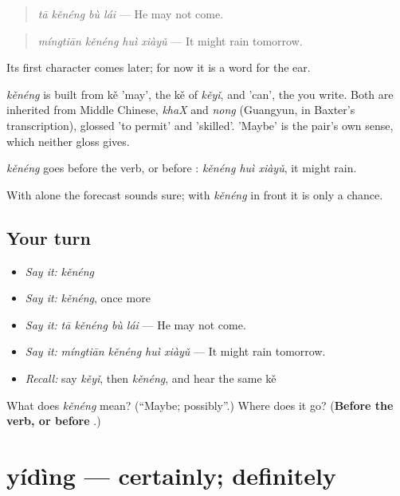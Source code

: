 \begin{quote}
\emph{tā kěnéng bù lái} — He may not come.
\end{quote}

\begin{quote}
\emph{míngtiān kěnéng huì xiàyǔ} — It might rain tomorrow.
\end{quote}

Its first character comes later; for now it is a word for the ear.

\begin{cousinweb}
\emph{kěnéng} is built from kě 'may', the kě of \emph{kěyǐ}, and  'can', the  you write. Both are inherited from Middle Chinese, \emph{khaX} and \emph{nong} (Guangyun, in Baxter's transcription), glossed 'to permit' and 'skilled'. 'Maybe' is the pair's own sense, which neither gloss gives.
\end{cousinweb}

\begin{grammarlens}[title={What you've built}]
\emph{kěnéng} goes before the verb, or before : \emph{kěnéng huì xiàyǔ}, it might rain.

With  alone the forecast sounds sure; with \emph{kěnéng} in front it is only a chance.
\end{grammarlens}

\subsection*{Your turn}
\begin{itemize}
\raggedright
  \item \emph{Say it:} \emph{kěnéng}
  \item \emph{Say it:} \emph{kěnéng}, once more
  \item \emph{Say it:} \emph{tā kěnéng bù lái} — He may not come.
  \item \emph{Say it:} \emph{míngtiān kěnéng huì xiàyǔ} — It might rain tomorrow.
  \item \emph{Recall:} say \emph{kěyǐ}, then \emph{kěnéng}, and hear the same kě
\end{itemize}

\begin{tcolorbox}[breakable,colback=teal!4,colframe=teal!35!black,title={Before you move on}]
What does \emph{kěnéng} mean? (\textquotedblleft{}Maybe; possibly\textquotedblright{}.) Where does it go? (\textbf{Before the verb, or before }.)
\end{tcolorbox}
\section[yídìng]{yídìng — certainly; definitely}

